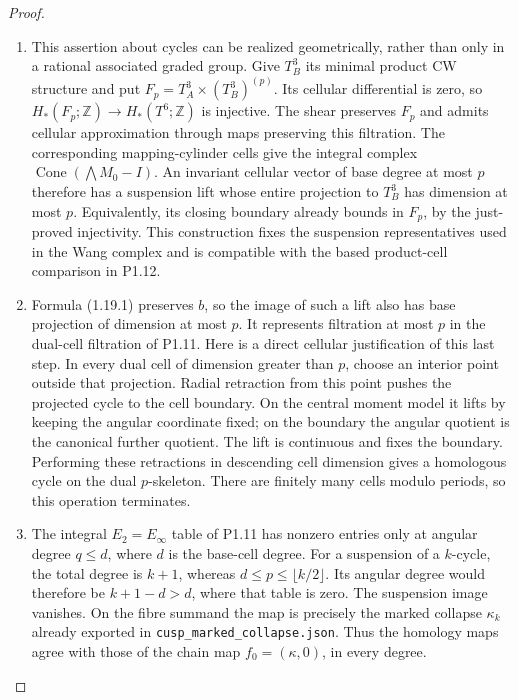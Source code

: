 \begin{proof}
\begin{enumerate}[label=\arabic*.]
\item This assertion about cycles can be realized geometrically, rather
than only in a rational associated graded group.  Give $T_B^3$ its
minimal product CW structure and put
$F_p=T_A^3\times(T_B^3)^{(p)}$.
Its cellular differential is zero, so
$H_*(F_p;\mathbb Z)\to H_*(T^6;\mathbb Z)$ is injective.
The shear preserves $F_p$ and admits cellular approximation through
maps preserving this filtration.  The corresponding mapping-cylinder
cells give the integral complex
$\operatorname{Cone}(\bigwedge M_0-I)$.
An invariant cellular vector of base degree at most $p$ therefore
has a suspension lift whose entire projection to $T_B^3$ has dimension
at most $p$.  Equivalently, its closing boundary already bounds in
$F_p$, by the just-proved injectivity.  This construction fixes the
suspension representatives used in the Wang complex and is compatible
with the based product-cell comparison in P1.12.

\item Formula (1.19.1) preserves $b$, so the image of such a lift also has
base projection of dimension at most $p$.  It represents filtration
at most $p$ in the dual-cell filtration of P1.11.  Here is a direct
cellular justification of this last step.  In every dual cell of
dimension greater than $p$, choose an interior point outside that
projection.  Radial retraction from this point pushes the projected
cycle to the cell boundary.  On the central moment model it lifts
by keeping the angular coordinate fixed; on the boundary the angular
quotient is the canonical further quotient.  The lift is continuous
and fixes the boundary.  Performing these retractions in descending
cell dimension gives a homologous cycle on the dual $p$-skeleton.
There are finitely many cells modulo periods, so this operation
terminates.

\item The integral $E_2=E_\infty$ table of P1.11 has nonzero entries only
at angular degree $q\leq d$, where $d$ is the base-cell degree.
For a suspension of a $k$-cycle, the total degree is $k+1$, whereas
$d\leq p\leq\lfloor k/2\rfloor$. Its angular degree would therefore
be $k+1-d>d$, where that table is zero.  The suspension image
vanishes.  On the fibre summand the map is precisely the marked
collapse $\kappa_k$ already exported in
\texttt{cusp\_marked\_collapse.json}.  Thus the homology maps agree
with those of the chain map $f_0=(\kappa,0)$, in every degree.


\end{enumerate}
\end{proof}
